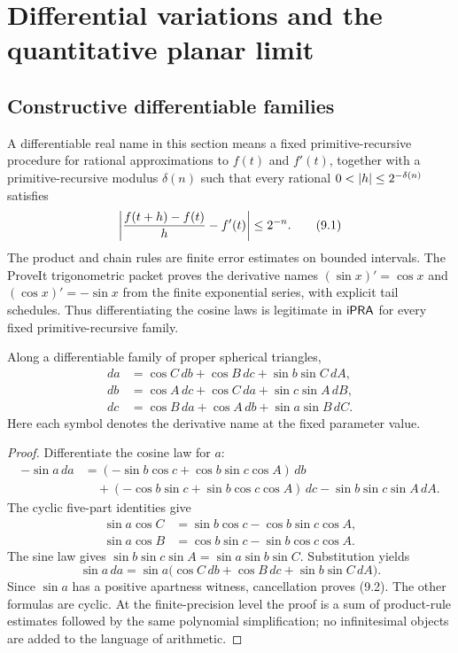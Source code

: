 \section{Differential variations and the quantitative planar limit}
\label{sec:differential-limit}

\subsection{Constructive differentiable families}

A differentiable real name in this section means a fixed primitive-recursive
procedure for rational approximations to \(f(t)\) and \(f'(t)\), together with
a primitive-recursive modulus \(\delta(n)\) such that every rational
\(0<\left|h\right|\le2^{-\delta(n)}\) satisfies
\begin{equation}
 \left|\frac{f(t+h)-f(t)}h-f'(t)\right|\le2^{-n}.                 \tag{9.1}
\end{equation}
The product and chain rules are finite error estimates on bounded intervals.
The ProveIt trigonometric packet proves the derivative names
\((\sin x)'=\cos x\) and \((\cos x)'=-\sin x\) from the finite exponential
series, with explicit tail schedules.  Thus differentiating the cosine laws is
legitimate in \(\mathsf{iPRA}\) for every fixed primitive-recursive family.

\begin{theorem}
\label{thm:differential}
Along a differentiable family of proper spherical triangles,
\begin{align}
 da&=\cos C\,db+\cos B\,dc+\sin b\sin C\,dA,              \tag{9.2}\\
 db&=\cos A\,dc+\cos C\,da+\sin c\sin A\,dB,              \tag{9.3}\\
 dc&=\cos B\,da+\cos A\,db+\sin a\sin B\,dC.              \tag{9.4}
\end{align}
Here each symbol denotes the derivative name at the fixed parameter value.
\end{theorem}

\begin{proof}
Differentiate the cosine law for \(a\):
\begin{align*}
 -\sin a\,da
 &=(-\sin b\cos c+\cos b\sin c\cos A)\,db\\
 &\quad+(-\cos b\sin c+\sin b\cos c\cos A)\,dc
       -\sin b\sin c\sin A\,dA.
\end{align*}
The cyclic five-part identities give
\begin{align*}
 \sin a\cos C&=\sin b\cos c-\cos b\sin c\cos A,\\
 \sin a\cos B&=\cos b\sin c-\sin b\cos c\cos A.
\end{align*}
The sine law gives
\(
 \sin b\sin c\sin A=\sin a\sin b\sin C
\).
Substitution yields
\[
 \sin a\,da=
 \sin a\bigl(\cos C\,db+\cos B\,dc+\sin b\sin C\,dA\bigr).
\]
Since \(\sin a\) has a positive apartness witness, cancellation proves (9.2).
The other formulas are cyclic.  At the finite-precision level the proof is a
sum of product-rule estimates followed by the same polynomial simplification;
no infinitesimal objects are added to the language of arithmetic.
\end{proof}

